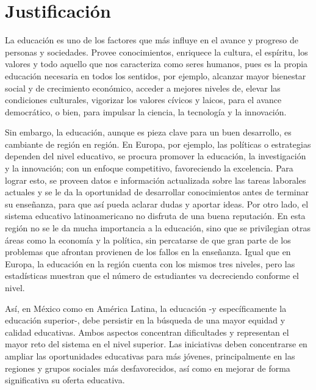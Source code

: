 \section{Justificación}

\noindent
La educación es uno de los factores que más influye en el avance y progreso de personas y sociedades. 
Provee conocimientos, enriquece la cultura, el espíritu, los valores y todo aquello que nos caracteriza 
como seres humanos, pues es la propia educación necesaria en todos los sentidos, por ejemplo, alcanzar 
mayor bienestar social y de crecimiento económico, acceder a mejores niveles de, elevar las condiciones 
culturales, vigorizar los valores cívicos y laicos, para el avance democrático, o bien, para impulsar 
la ciencia, la tecnología y la innovación. \cite{UNAM_Importancia}

\noindent
\newline
Sin embargo, la educación, aunque es pieza clave para un buen desarrollo, es cambiante de región en región.
En Europa, por ejemplo, las políticas o estrategias dependen del nivel educativo, se procura promover la 
educación, la investigación y la innovación; con un enfoque competitivo, favoreciendo la excelencia. 
Para lograr esto, se proveen datos e información actualizada sobre las tareas laborales actuales y 
se le da la oportunidad de desarrollar conocimientos antes de terminar su enseñanza, para que así pueda 
aclarar dudas y aportar ideas. Por otro lado, el sistema educativo latinoamericano no disfruta de una buena 
reputación. En esta región no se le da mucha importancia a la educación, sino que se privilegian otras áreas 
como la economía y la política, sin percatarse de que gran parte de los problemas que afrontan provienen de 
los fallos en la enseñanza. Igual que en Europa, la educación en la región cuenta con los mismos tres niveles,
pero las estadísticas muestran que el número de estudiantes va decreciendo conforme el nivel. \cite{AZ}

\noindent
\newline
Así, en México como en América Latina, la educación -y específicamente la educación superior-, debe persistir
en la búsqueda de una mayor equidad y calidad educativas. Ambos aspectos concentran dificultades y representan 
el mayor reto del sistema en el nivel superior. Las iniciativas deben concentrarse en ampliar las oportunidades 
educativas para más jóvenes, principalmente en las regiones y grupos sociales más 
desfavorecidos, así como en mejorar de forma significativa su oferta educativa. \cite{UNAM_Estado}

